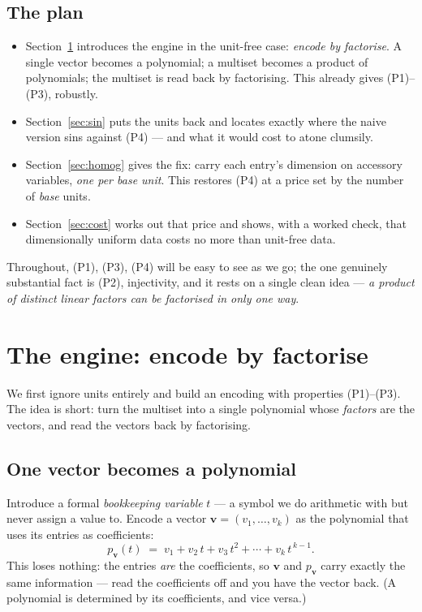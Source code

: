 \documentclass[11pt,a4paper]{article}
\theoremstyle{definition}
\theoremstyle{plain}
\newcommand{\bvec}[1]{\mathbf{#1}}
\begin{document}
\subsection{The plan}

\begin{itemize}[leftmargin=*]
\item Section~\ref{sec:factorise} introduces the engine in the unit-free case:
      \emph{encode by factorise}. A single vector becomes a polynomial; a multiset
      becomes a product of polynomials; the multiset is read back by factorising.
      This already gives (P1)--(P3), robustly.
\item Section~\ref{sec:sin} puts the units back and locates exactly where the
      naive version sins against (P4) --- and what it would cost to atone clumsily.
\item Section~\ref{sec:homog} gives the fix: carry each entry's dimension on
      accessory variables, \emph{one per base unit}. This restores (P4) at a price
      set by the number of \emph{base} units.
\item Section~\ref{sec:cost} works out that price and shows, with a worked check,
      that dimensionally uniform data costs no more than unit-free data.
\end{itemize}

\noindent
Throughout, (P1), (P3), (P4) will be easy to see as we go; the one genuinely
substantial fact is (P2), injectivity, and it rests on a single clean idea ---
\emph{a product of distinct linear factors can be factorised in only one way}.

\section{The engine: encode by factorise}
\label{sec:factorise}

We first ignore units entirely and build an encoding with properties
(P1)--(P3). The idea is short: turn the multiset into a single polynomial whose
\emph{factors} are the vectors, and read the vectors back by factorising.

\subsection{One vector becomes a polynomial}

Introduce a formal \emph{bookkeeping variable} $t$ --- a symbol we do arithmetic
with but never assign a value to. Encode a vector $\bvec v=(v_1,\dots,v_k)$ as the
polynomial that uses its entries as coefficients:
\begin{equation}\label{eq:pv}
   p_{\bvec v}(t)\;=\;v_1+v_2\,t+v_3\,t^2+\cdots+v_k\,t^{\,k-1}.
\end{equation}
This loses nothing: the entries \emph{are} the coefficients, so $\bvec v$ and
$p_{\bvec v}$ carry exactly the same information --- read the coefficients off and
you have the vector back. (A polynomial is determined by its coefficients, and
vice versa.)
\end{document}
